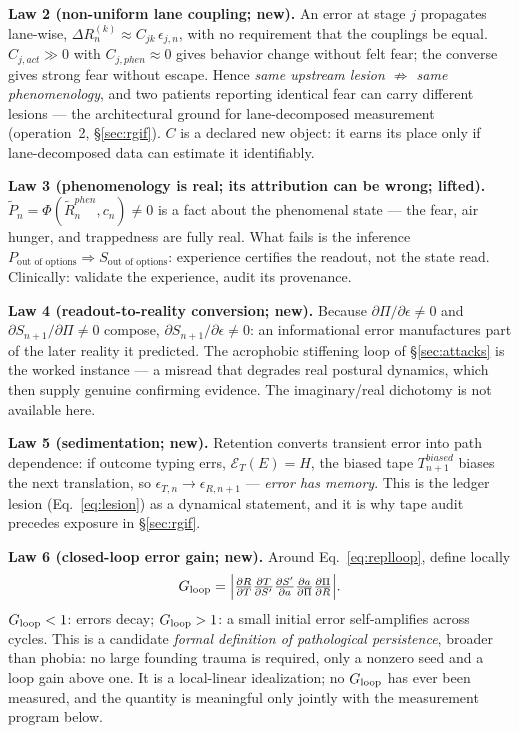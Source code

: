 \documentclass[9pt,twocolumn]{article}
\begin{document}
\textbf{Law 2 (non-uniform lane coupling; new).} An error at stage $j$ propagates lane-wise, $\Delta R^{(k)}_n\approx C_{jk}\,\epsilon_{j,n}$, with no requirement that the couplings be equal. $C_{j,act}\gg0$ with $C_{j,phen}\approx0$ gives behavior change without felt fear; the converse gives strong fear without escape. Hence \emph{same upstream lesion $\not\Rightarrow$ same phenomenology}, and two patients reporting identical fear can carry different lesions --- the architectural ground for lane-decomposed measurement (operation~2, \S\ref{sec:rgif}). $C$ is a declared new object: it earns its place only if lane-decomposed data can estimate it identifiably.

\textbf{Law 3 (phenomenology is real; its attribution can be wrong; lifted).} $\tilde P_n=\Phi(\tilde R^{phen}_n,c_n)\neq0$ is a fact about the phenomenal state --- the fear, air hunger, and trappedness are fully real. What fails is the inference $P_{\text{out of options}}\Rightarrow S_{\text{out of options}}$: experience certifies the readout, not the state read. Clinically: validate the experience, audit its provenance.

\textbf{Law 4 (readout-to-reality conversion; new).} Because $\partial\Pi/\partial\epsilon\neq0$ and $\partial S_{n+1}/\partial\Pi\neq0$ compose, $\partial S_{n+1}/\partial\epsilon\neq0$: an informational error manufactures part of the later reality it predicted. The acrophobic stiffening loop of \S\ref{sec:attacks} is the worked instance --- a misread that degrades real postural dynamics, which then supply genuine confirming evidence. The imaginary/real dichotomy is not available here.

\textbf{Law 5 (sedimentation; new).} Retention converts transient error into path dependence: if outcome typing errs, $\mathcal E_T(E)=H$, the biased tape $T^{biased}_{n+1}$ biases the next translation, so $\epsilon_{T,n}\to\epsilon_{R,n+1}$ --- \emph{error has memory}. This is the ledger lesion (Eq.~\ref{eq:lesion}) as a dynamical statement, and it is why tape audit precedes exposure in \S\ref{sec:rgif}.

\textbf{Law 6 (closed-loop error gain; new).} Around Eq.~\ref{eq:replloop}, define locally
\begin{equation}
G_{\rm loop}=\Big|\tfrac{\partial R}{\partial T}\tfrac{\partial T}{\partial S'}\tfrac{\partial S'}{\partial a}\tfrac{\partial a}{\partial\Pi}\tfrac{\partial\Pi}{\partial R}\Big|.
\label{eq:gloop}
\end{equation}
$G_{\rm loop}<1$: errors decay; $G_{\rm loop}>1$: a small initial error self-amplifies across cycles. This is a candidate \emph{formal definition of pathological persistence}, broader than phobia: no large founding trauma is required, only a nonzero seed and a loop gain above one. It is a local-linear idealization; no $G_{\rm loop}$ has ever been measured, and the quantity is meaningful only jointly with the measurement program below.
\end{document}
